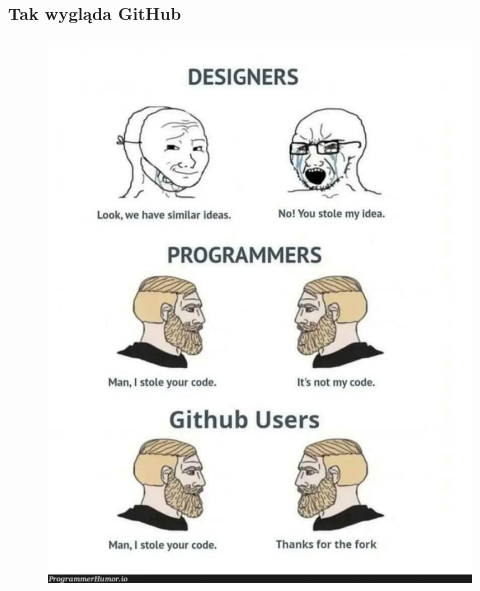 \documentclass[10pt,t]{beamer}
\begin{document}
\begin{frame}
  \frametitle{Tak wygląda GitHub}


  \begin{figure}

    \centering


    \includegraphics[scale=0.28]
    {./PresentationsPictures/How-GitHub-works.jpeg}

  \end{figure}

\end{frame}
\end{document}
